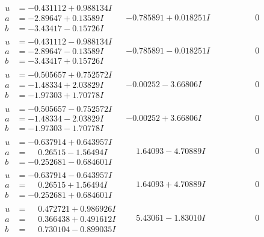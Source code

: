 \documentclass[1p]{elsarticle_modified}
\theoremstyle{definition}
\begin{document}
$$\begin{array}{c|c|c}
\begin{aligned}
u &= -0.431112 + 0.988134 I \\
a &= -2.89647 + 0.13589 I \\
b &= -3.43417 - 0.15726 I\end{aligned}
 & -0.785891 + 0.018251 I & \phantom{-0.000000 } 0 \\ \hline\begin{aligned}
u &= -0.431112 - 0.988134 I \\
a &= -2.89647 - 0.13589 I \\
b &= -3.43417 + 0.15726 I\end{aligned}
 & -0.785891 - 0.018251 I & \phantom{-0.000000 } 0 \\ \hline\begin{aligned}
u &= -0.505657 + 0.752572 I \\
a &= -1.48334 + 2.03829 I \\
b &= -1.97303 + 1.70778 I\end{aligned}
 & -0.00252 - 3.66806 I & \phantom{-0.000000 } 0 \\ \hline\begin{aligned}
u &= -0.505657 - 0.752572 I \\
a &= -1.48334 - 2.03829 I \\
b &= -1.97303 - 1.70778 I\end{aligned}
 & -0.00252 + 3.66806 I & \phantom{-0.000000 } 0 \\ \hline\begin{aligned}
u &= -0.637914 + 0.643957 I \\
a &= \phantom{-}0.26515 - 1.56494 I \\
b &= -0.252681 - 0.684601 I\end{aligned}
 & \phantom{-}1.64093 - 4.70889 I & \phantom{-0.000000 } 0 \\ \hline\begin{aligned}
u &= -0.637914 - 0.643957 I \\
a &= \phantom{-}0.26515 + 1.56494 I \\
b &= -0.252681 + 0.684601 I\end{aligned}
 & \phantom{-}1.64093 + 4.70889 I & \phantom{-0.000000 } 0 \\ \hline\begin{aligned}
u &= \phantom{-}0.472721 + 0.986926 I \\
a &= \phantom{-}0.366438 + 0.491612 I \\
b &= \phantom{-}0.730104 - 0.899035 I\end{aligned}
 & \phantom{-}5.43061 - 1.83010 I & \phantom{-0.000000 } 0 \\ \hline\begin{aligned}

\end{aligned}
\end{array}$$
\end{document}
